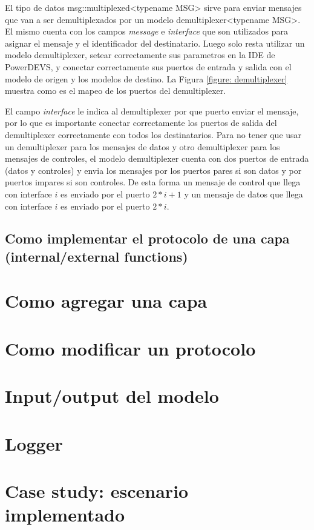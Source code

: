 \documentclass[10pt,a4paper]{article}
\begin{document}
El tipo de datos msg::multiplexed<typename MSG> sirve para enviar mensajes que van a ser demultiplexados por un modelo demultiplexer<typename MSG>. El mismo cuenta con los campos \textit{message} e \textit{interface} que son utilizados para asignar el mensaje y el identificador del destinatario. Luego solo resta utilizar un modelo demultiplexer, setear correctamente sus parametros en la IDE de PowerDEVS, y conectar correctamente sus puertos de entrada y salida con el modelo de origen y los modelos de destino. La Figura \ref{figure: demultiplexer} muestra como es el mapeo de los puertos del demultiplexer. \\


El campo \textit{interface} le indica al demultiplexer por que puerto enviar el mensaje, por lo que es importante conectar correctamente los puertos de salida del demultiplexer correctamente con todos los destinatarios. Para no tener que usar un demultiplexer para los mensajes de datos y otro demultiplexer para los mensajes de controles, el modelo demultiplexer cuenta con dos puertos de entrada (datos y controles) y envia los mensajes por los puertos pares si son datos y por puertos impares si son controles. De esta forma un mensaje de control que llega con interface $i$ es enviado por el puerto $2*i+1$ y un mensaje de datos que llega con interface $i$ es enviado por el puerto $2*i$.

\subsection{Como implementar el protocolo de una capa (internal/external functions)}
\section{Como agregar una capa}
\section{Como modificar un protocolo}
\section{Input/output del modelo}
\section{Logger}
\section{Case study: escenario implementado}
\end{document}
